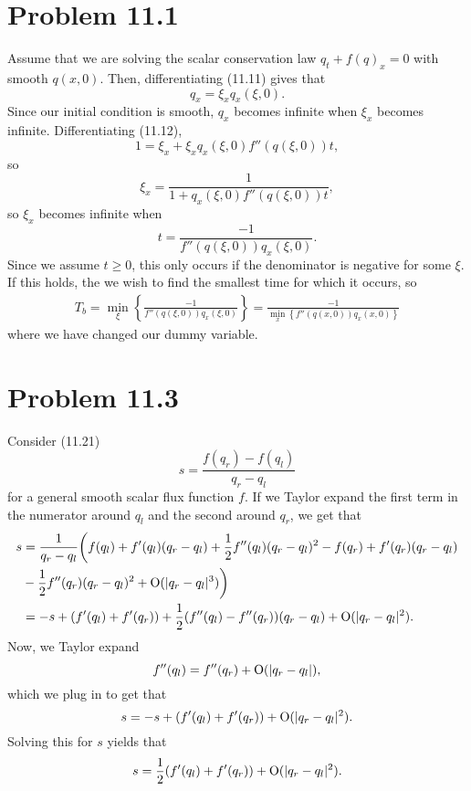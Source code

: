 \documentclass{article}
\begin{document}
\section{Problem 11.1}
Assume that we are solving the scalar conservation law $q_t+f(q)_x=0$ with smooth $q(x,0)$. Then, differentiating (11.11) gives that
\[
q_x=\xi_xq_x(\xi,0).
\]
Since our initial condition is smooth, $q_x$ becomes infinite when $\xi_x$ becomes infinite. Differentiating (11.12), 
\[
1=\xi_x+\xi_xq_x(\xi,0)f''(q(\xi,0))t,
\] 
so
\[
\xi_x=\frac{1}{1+q_x(\xi,0)f''(q(\xi,0))t},
\]
so $\xi_x$ becomes infinite when
\[
t=\frac{-1}{f''(q(\xi,0))q_x(\xi,0)}.
\]
Since we assume $t\geq0$, this only occurs if the denominator is negative for some $\xi$. If this holds, the we wish to find the smallest time for which it occurs, so
\begin{align*}
T_b=\min_{\xi}\left\{\frac{-1}{f''(q(\xi,0))q_x(\xi,0)}\right\}=\frac{-1}{\min_{x}\left\{f''(q(x,0))q_x(x,0)\right\}}
\end{align*}
where we have changed our dummy variable.

\section{Problem 11.3}
Consider (11.21) 
\[
s=\frac{f(q_r)-f(q_l)}{q_r-q_l}
\]
for a general smooth scalar flux function $f$. If we Taylor expand the first term in the numerator around $q_l$ and the second around $q_r$, we get that
\begin{align*}
s&=\frac{1}{q_r-q_l}\biggr(f(q_l)+f'(q_l)(q_r-q_l)+\frac{1}{2}f''(q_l)(q_r-q_l)^2-f(q_r)+f'(q_r)(q_r-q_l)\\&-\frac{1}{2}f''(q_r)(q_r-q_l)^2+\operatorname{O}(|q_r-q_l|^3)\biggr)\\&=
-s+(f'(q_l)+f'(q_r))+\frac{1}{2}(f''(q_l)-f''(q_r))(q_r-q_l)+\operatorname{O}(|q_r-q_l|^2).
\end{align*}
Now, we Taylor expand
\[
f''(q_l)=f''(q_r)+\operatorname{O}(|q_r-q_l|),
\]
which we plug in to get that
\[
s=-s+(f'(q_l)+f'(q_r))+\operatorname{O}(|q_r-q_l|^2).
\]
Solving this for $s$ yields that 
\[
s=\frac{1}{2}(f'(q_l)+f'(q_r))+\operatorname{O}(|q_r-q_l|^2).
\]
\end{document}
